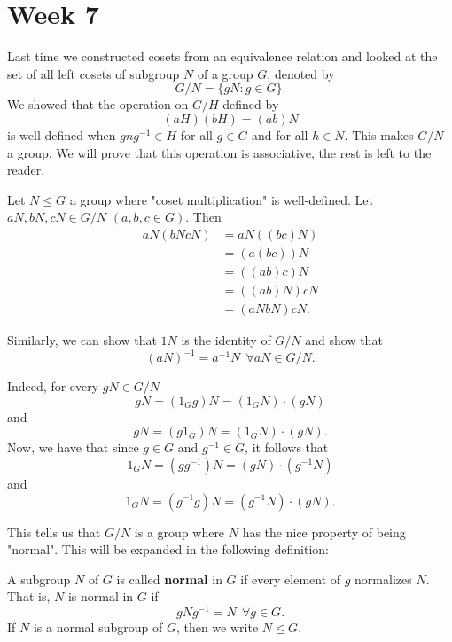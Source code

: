 \section{Week 7}

Last time we constructed cosets from an equivalence relation and looked at the set of all left cosets of subgroup \( N  \) of a group \( G  \), denoted by
\[  G / N = \{ gN : g \in G  \}.  \]
We showed that the operation on \( G / H  \) defined by
\[  (aH)(bH) = (ab) N \]
is well-defined when \( g n g^{-1} \in H  \) for all \( g \in G  \) and for all \( h \in N  \). This makes \( G  / N  \) a group. We will prove that this operation is associative, the rest is left to the reader. 

Let \( N \leq G  \) a group where "coset multiplication" is well-defined. Let \( aN, bN , cN \in G / N  \) \( (a,b,c \in G) \). Then 
\begin{align*}
    aN (bN cN) &= aN((bc)N) \\
               &= (a(bc)) N \\
               &= ((ab)c) N \\
               &= ((ab)N) cN \\
               &= (aN bN) cN.
\end{align*}

Similarly, we can show that \( 1N  \) is the identity of \( G / N   \) and show that 
\[  (aN)^{-1} = a^{-1}N \ \ \forall aN \in G / N.  \]

Indeed, for every \( g N \in G / N \) 
\[ g N =   (1_G g) N  =  (1_G N) \cdot (g N )    \]
and 
\[  g N = (g 1_G) N = (1_G N) \cdot (gN ). \]
Now, we have that since \( g \in G  \) and \( g^{-1} \in G  \), it follows that 
\[  {1}_{G} N = (g g^{-1})N = (g N) \cdot (g^{-1} N ) \]
and 
\[ {1}_{G} N = (g^{-1} g) N = (g^{-1} N ) \cdot (g N).  \]

This tells us that \( G /N  \) is a group where \( N  \) has the nice property of being "normal". This will be expanded in the following definition:

\begin{definition}
   A subgroup \( N  \) of \( G  \) is called \textbf{normal} in \( G  \) if every element of \( g  \) normalizes \( N  \). That is, \( N  \) is normal in \( G  \) if 
   \[  g N g^{-1} = N \ \ \forall g \in G.  \]
   If \( N  \) is a normal subgroup of \( G  \), then we write \( N \trianglelefteq G . \)
\end{definition}

